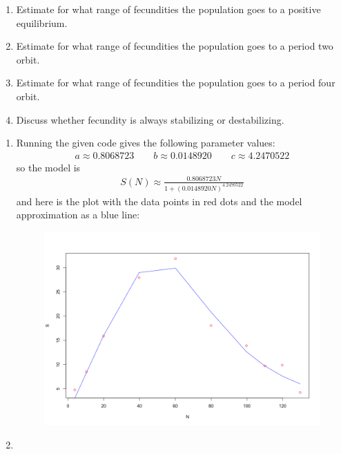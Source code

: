 \documentclass{article} %
\theoremstyle{plain}
\numberwithin{equation}{section} %
\numberwithin{figure}{section} %
\numberwithin{table}{section} %
\begin{document}
{\begin{enumerate}[\ \ (a)]
    \begin{enumerate}[\ \ (i)]
        \item Estimate for what range of fecundities the population goes to a positive equilibrium.
        \item Estimate for what range of fecundities the population goes to a period two orbit.
        \item Estimate for what range of fecundities the population goes to a period four orbit.
        \item Discuss whether fecundity is always stabilizing or destabilizing.
    \end{enumerate}
\end{enumerate}}

\begin{enumerate}[\ \ (a)]
    \item
        Running the given code gives the following parameter values:
        \begin{align}
            a \approx 0.8068723 \qquad b \approx 0.0148920 \qquad c \approx 4.2470522
        \end{align}
        so the model is
        \begin{align}
            S(N) \approx \frac{0.8068723N}{1 + (0.0148920N)^{4.2470522}}
        \end{align}
        and here is the plot with the data points in red dots and the model approximation as a blue line:
        \begin{figure}[ht!]
            \centering
            \includegraphics[scale=0.3]{4a.png}
        \end{figure}
    \item
        
\end{enumerate}
\end{document}
